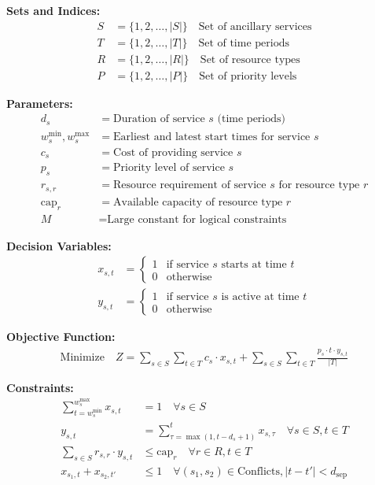 \documentclass{article}
\begin{document}
\textbf{Sets and Indices:}
\begin{align}
S &= \{1, 2, \ldots, |S|\} \quad \text{Set of ancillary services} \\
T &= \{1, 2, \ldots, |T|\} \quad \text{Set of time periods} \\
R &= \{1, 2, \ldots, |R|\} \quad \text{Set of resource types} \\
P &= \{1, 2, \ldots, |P|\} \quad \text{Set of priority levels}
\end{align}

\textbf{Parameters:}
\begin{align}
d_s &= \text{Duration of service } s \text{ (time periods)} \\
w_s^{\text{min}}, w_s^{\text{max}} &= \text{Earliest and latest start times for service } s \\
c_s &= \text{Cost of providing service } s \\
p_s &= \text{Priority level of service } s \\
r_{s,r} &= \text{Resource requirement of service } s \text{ for resource type } r \\
\text{cap}_r &= \text{Available capacity of resource type } r \\
M &= \text{Large constant for logical constraints}
\end{align}

\textbf{Decision Variables:}
\begin{align}
x_{s,t} &= \begin{cases}
1 & \text{if service } s \text{ starts at time } t \\
0 & \text{otherwise}
\end{cases} \\
y_{s,t} &= \begin{cases}
1 & \text{if service } s \text{ is active at time } t \\
0 & \text{otherwise}
\end{cases}
\end{align}

\textbf{Objective Function:}
\begin{align}
\text{Minimize} \quad Z = \sum_{s \in S} \sum_{t \in T} c_s \cdot x_{s,t} + \sum_{s \in S} \sum_{t \in T} \frac{p_s \cdot t \cdot y_{s,t}}{|T|}
\end{align}

\textbf{Constraints:}
\begin{align}
\sum_{t=w_s^{\text{min}}}^{w_s^{\text{max}}} x_{s,t} &= 1 \quad \forall s \in S \label{eq:assignment} \\
y_{s,t} &= \sum_{\tau=\max(1,t-d_s+1)}^{t} x_{s,\tau} \quad \forall s \in S, t \in T \label{eq:activity} \\
\sum_{s \in S} r_{s,r} \cdot y_{s,t} &\leq \text{cap}_r \quad \forall r \in R, t \in T \label{eq:capacity} \\
x_{s_1,t} + x_{s_2,t'} &\leq 1 \quad \forall (s_1,s_2) \in \text{Conflicts}, |t-t'| < d_{\text{sep}} \label{eq:conflicts}
\end{align}
\end{document}
